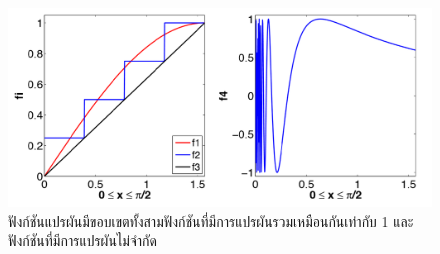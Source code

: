 \begin{figure}[H]
	\centering
	\includegraphics[width=0.8\linewidth]{image/boundary_condition/function_slove.png}
	\caption{ฟังก์ชันแปรผันมีขอบเขตทั้งสามฟังก์ชันที่มีการแปรผันรวมเหมือนกันเท่ากับ 1  และฟังก์ชันที่มีการแปรผันไม่จำกัด}
	\label{figure:sample-domain}
\end{figure}